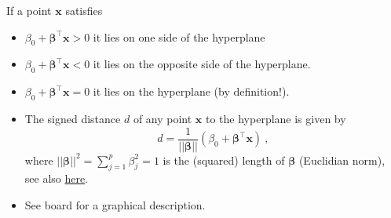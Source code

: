 \documentclass[10pt,ignorenonframetext,]{beamer}
\begin{document}
\begin{frame}

If a point \({\boldsymbol x}\) satisfies

\begin{itemize}
\item
  \(\beta_0+ {\boldsymbol \beta}^\top {\boldsymbol x}>0\) it lies on one
  side of the hyperplane
\item
  \(\beta_0+{\boldsymbol \beta}^\top {\boldsymbol x}<0\) it lies on the
  opposite side of the hyperplane.
\item
  \(\beta_0+{\boldsymbol \beta}^\top {\boldsymbol x}=0\) it lies on the
  hyperplane (by definition!).
\end{itemize}

\vspace{2mm}

\begin{itemize}
\item
  The signed distance \(d\) of any point \(\boldsymbol x\) to the
  hyperplane is given by
  \[d=\frac{1}{||{\boldsymbol\beta}||} (\beta_0 + {\boldsymbol \beta}^\top {\boldsymbol x} )\ ,\]
  where \(||{\boldsymbol\beta}||^2 = \sum_{j=1}^p \beta_j^2=1\) is the
  (squared) length of \(\boldsymbol \beta\) (Euclidian norm), see also
  \href{https://en.wikipedia.org/wiki/Distance_from_a_point_to_a_plane}{here}.
\item
  See board for a graphical description.
\end{itemize}

\end{frame}
\end{document}
